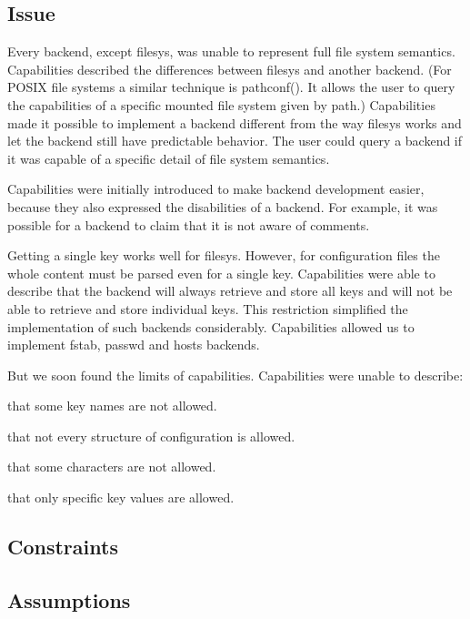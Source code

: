 \subsection*{Issue}

Every backend, except {\ttfamily filesys}, was unable to represent full file system semantics. Capabilities described the differences between {\ttfamily filesys} and another backend. (For P\+O\+S\+IX file systems a similar technique is {\ttfamily pathconf()}. It allows the user to query the capabilities of a specific mounted file system given by path.) Capabilities made it possible to implement a backend different from the way {\ttfamily filesys} works and let the backend still have predictable behavior. The user could query a backend if it was capable of a specific detail of file system semantics.

Capabilities were initially introduced to make backend development easier, because they also expressed the disabilities of a backend. For example, it was possible for a backend to claim that it is not aware of comments.

Getting a single key works well for {\ttfamily filesys}. However, for configuration files the whole content must be parsed even for a single key. Capabilities were able to describe that the backend will always retrieve and store all keys and will not be able to retrieve and store individual keys. This restriction simplified the implementation of such backends considerably. Capabilities allowed us to implement fstab, passwd and hosts backends.

But we soon found the limits of capabilities. Capabilities were unable to describe\+:


\begin{DoxyItemize}
\item that some key names are not allowed.
\item that not every structure of configuration is allowed.
\item that some characters are not allowed.
\item that only specific key values are allowed.
\end{DoxyItemize}

\subsection*{Constraints}

\subsection*{Assumptions}

